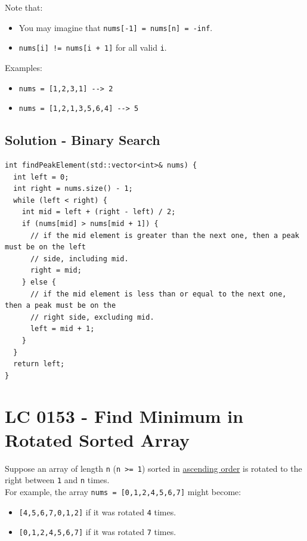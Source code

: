 Note that:
\begin{itemize}
	\item You may imagine that {\colorbox{CodeBackground}{\lstinline|nums[-1] = nums[n] = -inf|}}.
	\item {\colorbox{CodeBackground}{\lstinline|nums[i] != nums[i + 1]|}} for all valid {\colorbox{CodeBackground}{\lstinline|i|}}.
\end{itemize}

Examples:
\begin{itemize}
	\item {\colorbox{CodeBackground}{\lstinline|nums = [1,2,3,1] --> 2|}}
	\item {\colorbox{CodeBackground}{\lstinline|nums = [1,2,1,3,5,6,4] --> 5|}}
\end{itemize}

\subsection*{Solution - Binary Search}
\begin{lstlisting}
int findPeakElement(std::vector<int>& nums) {
  int left = 0;
  int right = nums.size() - 1;
  while (left < right) {
    int mid = left + (right - left) / 2;
    if (nums[mid] > nums[mid + 1]) {
      // if the mid element is greater than the next one, then a peak must be on the left
      // side, including mid.
      right = mid;
    } else {
      // if the mid element is less than or equal to the next one, then a peak must be on the
      // right side, excluding mid.
      left = mid + 1;
    }
  }
  return left;
}
\end{lstlisting}

\section{LC 0153 - Find Minimum in Rotated Sorted Array}\label{lc0153}
Suppose an array of length {\colorbox{CodeBackground}{\lstinline|n|}} ({\colorbox{CodeBackground}{\lstinline|n >= 1|}}) sorted in \ul{ascending order} is rotated to the right between {\colorbox{CodeBackground}{\lstinline|1|}} and {\colorbox{CodeBackground}{\lstinline|n|}} times. \\

For example, the array {\colorbox{CodeBackground}{\lstinline|nums = [0,1,2,4,5,6,7]|}} might become:
\begin{itemize}
	\item {\colorbox{CodeBackground}{\lstinline|[4,5,6,7,0,1,2]|}} if it was rotated {\colorbox{CodeBackground}{\lstinline|4|}} times.
	\item {\colorbox{CodeBackground}{\lstinline|[0,1,2,4,5,6,7]|}} if it was rotated {\colorbox{CodeBackground}{\lstinline|7|}} times.
\end{itemize}

